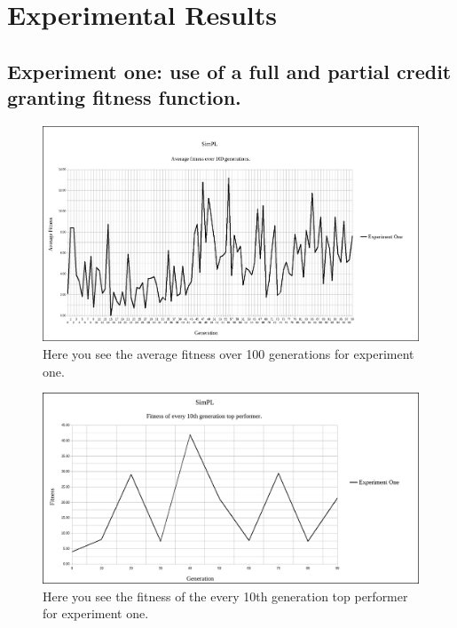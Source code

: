 \documentclass[a4paper,10pt]{article}
\begin{document}
\section{Experimental Results}

\subsection{Experiment one: use of a full and partial credit granting fitness function.}

\begin{figure}[H]  
  \centering
  \includegraphics[width=1\textwidth]{figures/exp1_avg_fit.png}
  \caption{Here you see the average fitness over 100 generations for experiment one.}
  \label{fig:exp1_avg_fit}
\end{figure}

\begin{figure}[H]  
  \centering
  \includegraphics[width=1\textwidth]{figures/exp1_10_tops.png}
  \caption{Here you see the fitness of the every 10th generation top performer for experiment one.}
  \label{fig:exp1_10_tops}
\end{figure}
\end{document}
